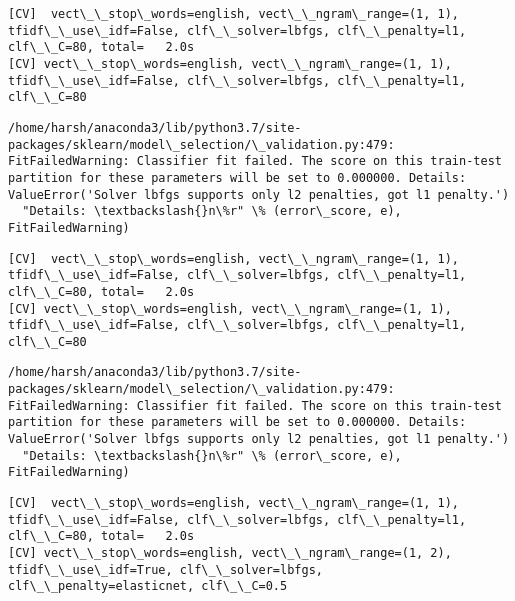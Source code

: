\documentclass[11pt]{article}
\begin{document}
    \begin{Verbatim}[commandchars=\\\{\}]
[CV]  vect\_\_stop\_words=english, vect\_\_ngram\_range=(1, 1), tfidf\_\_use\_idf=False, clf\_\_solver=lbfgs, clf\_\_penalty=l1, clf\_\_C=80, total=   2.0s
[CV] vect\_\_stop\_words=english, vect\_\_ngram\_range=(1, 1), tfidf\_\_use\_idf=False, clf\_\_solver=lbfgs, clf\_\_penalty=l1, clf\_\_C=80 

    \end{Verbatim}

    \begin{Verbatim}[commandchars=\\\{\}]
/home/harsh/anaconda3/lib/python3.7/site-packages/sklearn/model\_selection/\_validation.py:479: FitFailedWarning: Classifier fit failed. The score on this train-test partition for these parameters will be set to 0.000000. Details: 
ValueError('Solver lbfgs supports only l2 penalties, got l1 penalty.')
  "Details: \textbackslash{}n\%r" \% (error\_score, e), FitFailedWarning)

    \end{Verbatim}

    \begin{Verbatim}[commandchars=\\\{\}]
[CV]  vect\_\_stop\_words=english, vect\_\_ngram\_range=(1, 1), tfidf\_\_use\_idf=False, clf\_\_solver=lbfgs, clf\_\_penalty=l1, clf\_\_C=80, total=   2.0s
[CV] vect\_\_stop\_words=english, vect\_\_ngram\_range=(1, 1), tfidf\_\_use\_idf=False, clf\_\_solver=lbfgs, clf\_\_penalty=l1, clf\_\_C=80 

    \end{Verbatim}

    \begin{Verbatim}[commandchars=\\\{\}]
/home/harsh/anaconda3/lib/python3.7/site-packages/sklearn/model\_selection/\_validation.py:479: FitFailedWarning: Classifier fit failed. The score on this train-test partition for these parameters will be set to 0.000000. Details: 
ValueError('Solver lbfgs supports only l2 penalties, got l1 penalty.')
  "Details: \textbackslash{}n\%r" \% (error\_score, e), FitFailedWarning)

    \end{Verbatim}

    \begin{Verbatim}[commandchars=\\\{\}]
[CV]  vect\_\_stop\_words=english, vect\_\_ngram\_range=(1, 1), tfidf\_\_use\_idf=False, clf\_\_solver=lbfgs, clf\_\_penalty=l1, clf\_\_C=80, total=   2.0s
[CV] vect\_\_stop\_words=english, vect\_\_ngram\_range=(1, 2), tfidf\_\_use\_idf=True, clf\_\_solver=lbfgs, clf\_\_penalty=elasticnet, clf\_\_C=0.5 

    \end{Verbatim}
\end{document}
